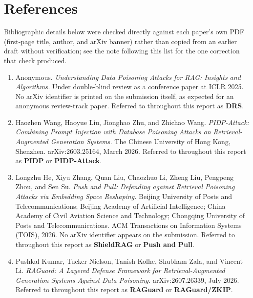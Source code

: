 \section*{References}
\label{sec:references}

Bibliographic details below were checked directly against each paper's own
PDF (first-page title, author, and arXiv banner) rather than copied from an
earlier draft without verification; see the note following this list for
the one correction that check produced.

\begin{enumerate}[leftmargin=2.2em,itemsep=0.5em]

\item Anonymous. \emph{Understanding Data Poisoning Attacks for RAG:
  Insights and Algorithms.} Under double-blind review as a conference
  paper at ICLR 2025. No arXiv identifier is printed on the submission
  itself, as expected for an anonymous review-track paper. Referred to
  throughout this report as \textbf{DRS}.

\item Haozhen Wang, Haoyue Liu, Jionghao Zhu, and Zhichao Wang.
  \emph{PIDP-Attack: Combining Prompt Injection with Database Poisoning
  Attacks on Retrieval-Augmented Generation Systems.} The Chinese University
  of Hong Kong, Shenzhen. arXiv:2603.25164, March 2026. Referred to
  throughout this report as \textbf{PIDP} or \textbf{PIDP-Attack}.

\item Longzhu He, Xiyu Zhang, Quan Liu, Chaozhuo Li, Zheng Liu, Pengpeng
  Zhou, and Sen Su. \emph{Push and Pull: Defending against Retrieval
  Poisoning Attacks via Embedding Space Reshaping.} Beijing University of
  Posts and Telecommunications; Beijing Academy of Artificial Intelligence;
  China Academy of Civil Aviation Science and Technology; Chongqing
  University of Posts and Telecommunications. ACM Transactions on
  Information Systems (TOIS), 2026. No arXiv identifier appears on the
  submission. Referred to throughout this report as \textbf{ShieldRAG} or
  \textbf{Push and Pull}.

\item Pushkal Kumar, Tucker Nielson, Tanish Kolhe, Shubham Zala, and Vincent
  Li. \emph{RAGuard: A Layered Defense Framework for Retrieval-Augmented
  Generation Systems Against Data Poisoning.} arXiv:2607.26339, July 2026.
  Referred to throughout this report as \textbf{RAGuard} or
  \textbf{RAGuard/ZKIP}.


\end{enumerate}

